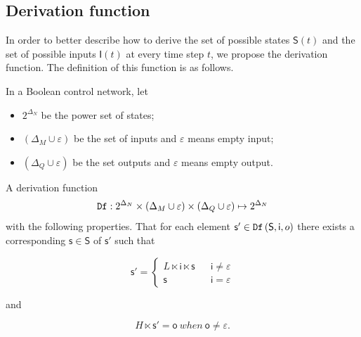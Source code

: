 \subsection{Derivation function}

 
In order to better describe how to derive the set of possible states $\mathsf{S}(t)$ and the set of possible inputs $\mathsf{I}(t)$ at every time step $t$, we propose the derivation function. The definition of this function is as follows.
\begin{definition} 
In a Boolean control network, let
\begin{itemize}
\item $2^{\Delta_N}$ be the power set of states; 
\item $(\Delta_M\cup\varepsilon)$ be the set of inputs and $\varepsilon$ means empty input; 
\item $(\Delta_Q\cup\varepsilon)$ be the set outputs and $\varepsilon$ means empty output.
\end{itemize} 
A derivation function \[{\tt Df}:2^{\Delta_N}\times (\Delta_M\cup\varepsilon) \times (\Delta_Q\cup\varepsilon) \mapsto 2^{\Delta_N}\] %
with the following properties. 
	That for each element $\mathsf{s}'\in {\tt Df}\left(\mathsf{S}, \mathsf{i}, {o}\right)$ there exists a corresponding $\mathsf{s}\in \mathsf{S}$ of $\mathsf{s}'$ such that 

\[\mathsf{s}'=\left\{
\begin{array}{rcl}
L\ltimes \mathsf{i}\ltimes \mathsf{s}      &      & {\mathsf{i}\neq \varepsilon}\\
\mathsf{s}       &      & {\mathsf{i}= \varepsilon}
\end{array} \right. \]

and 

\[H\ltimes \mathsf{s}'=\mathsf{o}\ when\ \mathsf{o}\neq \varepsilon.\]

\end{definition}
